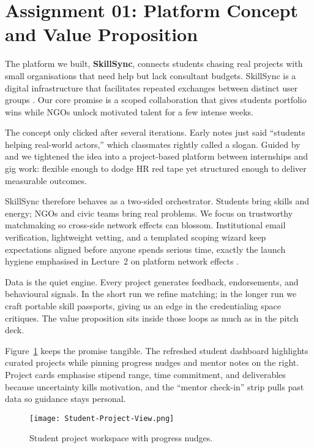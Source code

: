 \section*{Assignment 01: Platform Concept and Value Proposition}

The platform we built, \textbf{SkillSync}, connects students chasing real projects with small organisations that need help but lack consultant budgets. SkillSync is a digital infrastructure that facilitates repeated exchanges between distinct user groups \citep{Choudary2016}. Our core promise is a scoped collaboration that gives students portfolio wins while NGOs unlock motivated talent for a few intense weeks.

The concept only clicked after several iterations. Early notes just said ``students helping real-world actors,'' which classmates rightly called a slogan. Guided by \citet{Choudary2016} and \citet{Srnicek2017} we tightened the idea into a project-based platform between internships and gig work: flexible enough to dodge HR red tape yet structured enough to deliver measurable outcomes.

SkillSync therefore behaves as a two-sided orchestrator. Students bring skills and energy; NGOs and civic teams bring real problems. We focus on trustworthy matchmaking so cross-side network effects can blossom. Institutional email verification, lightweight vetting, and a templated scoping wizard keep expectations aligned before anyone spends serious time, exactly the launch hygiene emphasised in Lecture~2 on platform network effects \citep{Lecture02}.

Data is the quiet engine. Every project generates feedback, endorsements, and behavioural signals. In the short run we refine matching; in the longer run we craft portable skill passports, giving us an edge in the credentialing space \citet{Zuboff2019} critiques. The value proposition sits inside those loops as much as in the pitch deck.

Figure~\ref{fig:student-view} keeps the promise tangible. The refreshed student dashboard highlights curated projects while pinning progress nudges and mentor notes on the right. Project cards emphasise stipend range, time commitment, and deliverables because uncertainty kills motivation, and the ``mentor check-in'' strip pulls past data so guidance stays personal.

\begin{figure}[H]
  \centering
  \texttt{[image: Student-Project-View.png]}
  \caption{Student project workspace with progress nudges.}
  \label{fig:student-view}
\end{figure}

